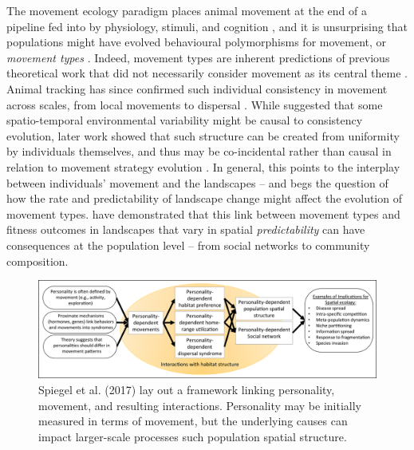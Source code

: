 The movement ecology paradigm places animal movement at the end of a
pipeline fed into by physiology, stimuli, and cognition
\citep[\emph{state},][]{wolf2010, wolf2012a}, and it is unsurprising
that populations might have evolved behavioural polymorphisms for
movement, or \emph{movement types}
\citep[\emph{sensu}][]{wolf2010, getz2015, netz2017}. Indeed, movement
types are inherent predictions of previous theoretical work that did not
necessarily consider movement as its central theme
\citep[e.g.][]{watson1971, lima1996}. Animal tracking has since
confirmed such individual consistency in movement across scales, from
local movements \citep{austin2004, leclerc2016} to dispersal
\citep{duckworth2007, clobert2009, cotej.2010, duckworth2012}. While
\citet{wolf2010} suggested that some spatio-temporal environmental
variability might be causal to consistency evolution, later work showed
that such structure can be created from uniformity by individuals
themselves, and thus may be co-incidental rather than causal in relation
to movement strategy evolution \citep{dejager2011, getz2015, netz2017}.
In general, this points to the interplay between individuals' movement
and the landscapes -- and begs the question of how the rate and
predictability of landscape change \citep[\emph{sensu
lato}][]{botero2015} might affect the evolution of movement types.
\citet{spiegel2017} have demonstrated that this link between movement
types \citep[\emph{fast} and \emph{slow}; see parallels with
earlier][]{wolf2007a} and fitness outcomes in landscapes that vary in
spatial \emph{predictability} can have consequences at the population
level -- from social networks to community composition.

\begin{figure}
    
    \includegraphics[width=0.7\linewidth]{fig01_spiegel_etal_2017.png}
    \caption{Spiegel et al. (2017) lay out a framework linking personality,
  movement, and resulting interactions. Personality may be initially
  measured in terms of movement, but the underlying causes can impact
  larger-scale processes such population spatial
  structure.}
    \label{fig:fig01_spiegel_etal_2017}
\end{figure}

